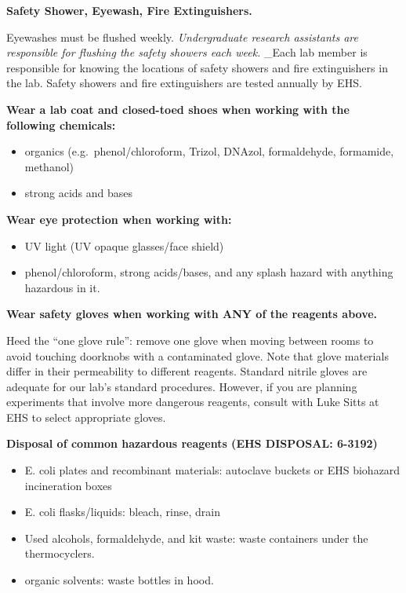 \documentclass[
]{book}
\providecommand{\tightlist}{%
  \setlength{\itemsep}{0pt}\setlength{\parskip}{0pt}}
\begin{document}
\textbf{Safety Shower, Eyewash, Fire Extinguishers.}

Eyewashes must be flushed weekly. \emph{Undergraduate research assistants are responsible for flushing the safety showers each week.} \_Each lab member is responsible for knowing the locations of safety showers and fire extinguishers in the lab. Safety showers and fire extinguishers are tested annually by EHS.

\textbf{Wear a lab coat and closed-toed shoes when working with the following chemicals:}

\begin{itemize}
\tightlist
\item
  organics (e.g.~phenol/chloroform, Trizol, DNAzol, formaldehyde, formamide, methanol)
\item
  strong acids and bases
\end{itemize}

\textbf{Wear eye protection when working with:}

\begin{itemize}
\item
  UV light (UV opaque glasses/face shield)
\item
  phenol/chloroform, strong acids/bases, and any splash hazard with anything hazardous in it.
\end{itemize}

\textbf{Wear safety gloves when working with ANY of the reagents above.}

Heed the ``one glove rule'': remove one glove when moving between rooms to avoid touching doorknobs with a contaminated glove. Note that glove materials differ in their permeability to different reagents. Standard nitrile gloves are adequate for our lab's standard procedures. However, if you are planning experiments that involve more dangerous reagents, consult with Luke Sitts at EHS to select appropriate gloves.

\textbf{Disposal of common hazardous reagents (EHS DISPOSAL: 6-3192)}

\begin{itemize}
\item
  E. coli plates and recombinant materials: autoclave buckets or EHS biohazard incineration boxes
\item
  E. coli flasks/liquids: bleach, rinse, drain
\item
  Used alcohols, formaldehyde, and kit waste: waste containers under the thermocyclers.
\item
  organic solvents: waste bottles in hood.
\end{itemize}
\end{document}
